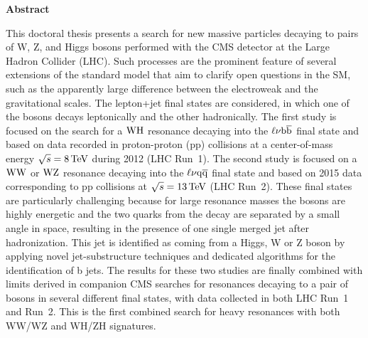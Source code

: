 \vspace*{\fill}

\begin{center}
\Large
\textbf{Abstract}
\end{center}

\small
\noindent This doctoral thesis presents a search for new massive particles decaying to pairs of W, Z, and Higgs bosons performed with the CMS detector at the Large Hadron Collider (LHC).
Such processes are the prominent feature of several extensions of the standard model that aim to clarify open questions in the SM, such as the apparently large difference between the electroweak and the gravitational scales. 
The lepton+jet final states are considered, in which one of the bosons decays leptonically and the other hadronically. 
The first study is focused on the search for a $\mathrm{W}\mathrm{H}$ resonance decaying into the $\ell\nu{\mathrm{b}\overline{\mathrm{b}}}$ final state and based on data recorded in proton-proton (pp) collisions at a center-of-mass energy $\sqrt{s} = 8\,\text{Te\hspace{-.08em}V}$ during 2012 (LHC Run~1).
The second study is focused on a $\mathrm{W}\mathrm{W}$ or $\mathrm{W}\mathrm{Z}$ resonance decaying into the $\ell\nu\mathrm{q}\overline{\mathrm{q}}$ final state and based on 2015 data corresponding to pp collisions at $\sqrt{s} = 13\,\text{Te\hspace{-.08em}V}$ (LHC Run~2).
These final states are particularly challenging because for large resonance masses the bosons are highly energetic and the two quarks from the decay are separated by a small angle in space, resulting in the presence of one single merged jet after hadronization. This jet is identified as coming from a Higgs, W or Z boson by applying novel jet-substructure techniques and dedicated algorithms for the identification of b jets.
The results for these two studies are finally combined with limits derived in companion CMS searches for resonances decaying to a pair of bosons in several different final states, with data collected in both LHC Run~1 and Run~2.
This is the first combined search for heavy resonances with both WW/WZ and WH/ZH signatures.\\

